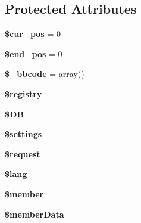 \subsection*{Protected Attributes}
\begin{DoxyCompactItemize}
\item 
\hypertarget{classbbcode__parent__class_a837d56bf71a642a81e9dadb143a1f640}{{\bfseries \$cur\-\_\-pos} = 0}\label{classbbcode__parent__class_a837d56bf71a642a81e9dadb143a1f640}

\item 
\hypertarget{classbbcode__parent__class_afafa6b23afe489ca88f5af37f89d835b}{{\bfseries \$end\-\_\-pos} = 0}\label{classbbcode__parent__class_afafa6b23afe489ca88f5af37f89d835b}

\item 
\hypertarget{classbbcode__parent__class_acc87cf39e446b5413ea424a0852d5edd}{{\bfseries \$\-\_\-bbcode} = array()}\label{classbbcode__parent__class_acc87cf39e446b5413ea424a0852d5edd}

\item 
\hypertarget{classbbcode__parent__class_a531e4a386aaa7f3e06d3642dc38d7e80}{{\bfseries \$registry}}\label{classbbcode__parent__class_a531e4a386aaa7f3e06d3642dc38d7e80}

\item 
\hypertarget{classbbcode__parent__class_a7dc56dc8b18ad37272b56fa7395bedef}{{\bfseries \$\-D\-B}}\label{classbbcode__parent__class_a7dc56dc8b18ad37272b56fa7395bedef}

\item 
\hypertarget{classbbcode__parent__class_ac7c3353107070daa85f641882931b358}{{\bfseries \$settings}}\label{classbbcode__parent__class_ac7c3353107070daa85f641882931b358}

\item 
\hypertarget{classbbcode__parent__class_abb35c8495a232b510389fa6d7b15d38a}{{\bfseries \$request}}\label{classbbcode__parent__class_abb35c8495a232b510389fa6d7b15d38a}

\item 
\hypertarget{classbbcode__parent__class_a7714b111b644017933931ec69a154102}{{\bfseries \$lang}}\label{classbbcode__parent__class_a7714b111b644017933931ec69a154102}

\item 
\hypertarget{classbbcode__parent__class_a5e1c849c6148a8732eee400fcee0d044}{{\bfseries \$member}}\label{classbbcode__parent__class_a5e1c849c6148a8732eee400fcee0d044}

\item 
\hypertarget{classbbcode__parent__class_ae9d848ba2cf6eee63bdc060e2dfcf95a}{{\bfseries \$member\-Data}}\label{classbbcode__parent__class_ae9d848ba2cf6eee63bdc060e2dfcf95a}


\end{DoxyCompactItemize}
